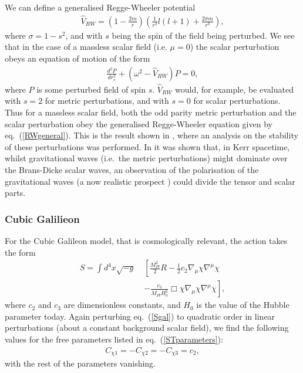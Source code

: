 \documentclass[10pt,twocolumn,preprintnumbers,amsmath,amssymb,nofootinbib
,superscriptaddress]{revtex4-1}
\begin{document}
{We can define a generalised Regge-Wheeler potential
\begin{align}
\hat{V}_{RW}=\left(1-\frac{2m}{r}\right)\left(\frac{1}{r^2}l(l+1)+\frac{2\sigma m}{r^3}\right),\label{Vhat}
\end{align}
where $\sigma=1-s^2$, and with $s$ being the spin of the field being perturbed. We see that in the case of a massless scalar field (i.e. $\mu=0$) the scalar perturbation obeys an equation of motion of the form
\begin{align}
\frac{d^2P}{dr_\ast^2}+\left(\omega^2-\hat{V}_{RW}\right)P=0,\label{RWgeneral}
\end{align}
where $P$ is some perturbed field of spin $s$. $\hat{V}_{RW}$ would, for example, be evaluated with $s=2$ for metric perturbations, and with $s=0$ for scalar perturbations. Thus for a massless scalar field, both the odd parity metric perturbation and the scalar perturbation obey the generalised Regge-Wheeler equation given by eq.~(\ref{RWgeneral}). This is the result shown in \cite{PhysRevD.34.333}, where an analysis on the stability of these perturbations was performed. In \cite{Saijo:1996iz} it was shown that, in Kerr spacetime, whilst gravitational waves (i.e.~the metric perturbations) might dominate over the Brans-Dicke scalar waves, an observation of the polarisation of the gravitational waves (a now realistic prospect \cite{2017arXiv170909660T}) could divide the tensor and scalar parts. 

\subsubsection{Cubic Galilieon}

For the Cubic Galileon model, that is cosmologically relevant, the action takes the form \cite{Barreira:2013eea}
\begin{align}
S=\int d^4x \sqrt{-g}\;&\left[\frac{M_{Pl}^2}{2}R-\frac{1}{2}c_2\nabla_\mu \chi \nabla^\mu \chi\right.\nonumber\\
&\left.-\frac{c_3}{M_{Pl}H_0^2}\Box\chi\nabla_\mu \chi \nabla^\mu \chi\right],\label{Sgal}
\end{align}
where $c_2$ and $c_3$ are dimensionless constants, and $H_0$ is the value of the Hubble parameter today. Again perturbing eq.~(\ref{Sgal}) to quadratic order in linear perturbations (about a constant background scalar field), we find the following values for the free parameters listed in eq.~(\ref{STparameters}):
\begin{align}
C_{\chi1}=-C_{\chi2}=-C_{\chi3}=c_2, 
\end{align}
with the rest of the parameters vanishing.

}
\end{document}
